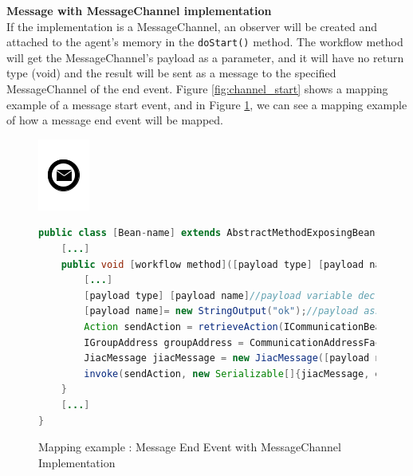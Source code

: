 \textbf{Message with MessageChannel implementation}\\
If the implementation is a MessageChannel, an observer will be created and attached to the agent's memory in the \verb|doStart()| method.
The workflow method will get the MessageChannel's payload as a parameter, and it will have no return type (void) and the result will be sent as a message to the specified MessageChannel of the end event. Figure \ref{fig:channel_start} shows a mapping example of a message start event, and in Figure \ref{fig:channel_end}, we can see a mapping example of how a message end event will be mapped.
\begin{figure}[h]
\begin{minipage}[c]{0.28\textwidth}
\includegraphics{images/mapping/message_end.png}
\end{minipage}
\begin{minipage}[c]{0.72\textwidth}
\begin{lstlisting}[language = Java]
public class [Bean-name] extends AbstractMethodExposingBean{
	[...]
	public void [workflow method]([payload type] [payload name]){
		[...]
		[payload type] [payload name]//payload variable declaration
		[payload name]= new StringOutput("ok");//payload assignment
		Action sendAction = retrieveAction(ICommunicationBean.ACTION_SEND);
		IGroupAddress groupAddress = CommunicationAddressFactory.createGroupAddress([channel]);
		JiacMessage jiacMessage = new JiacMessage([payload name]);
		invoke(sendAction, new Serializable[]{jiacMessage, groupAddress});
	}
	[...]
}
\end{lstlisting}
\end{minipage}
\caption{Mapping example : Message End Event with MessageChannel Implementation}%
\label{fig:channel_end}
\end{figure}
